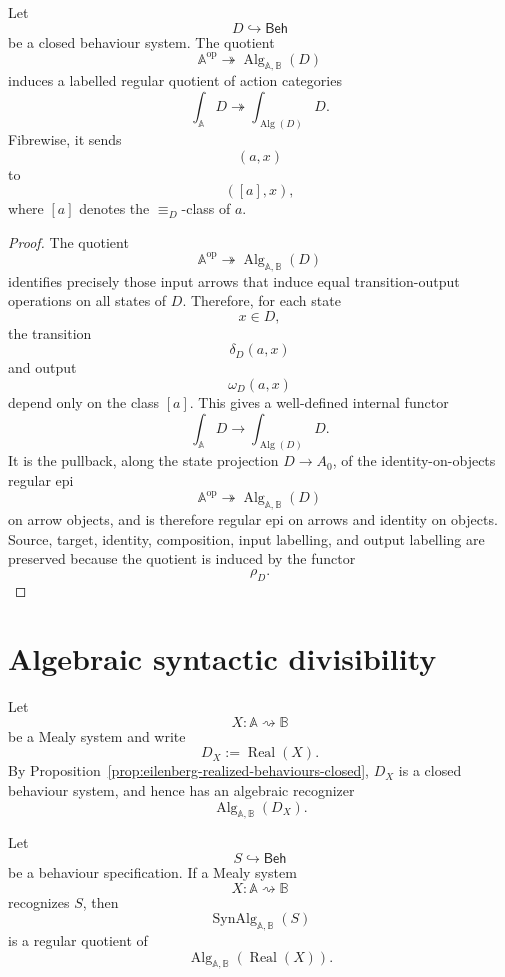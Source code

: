 \begin{proposition}
\label{prop:eilenberg-state-to-algebraic-quotient}
Let
\[
D\hookrightarrow\mathsf{Beh}
\]
be a closed behaviour system. The quotient
\[
\mathbb A^{\mathrm{op}}
\twoheadrightarrow
\operatorname{Alg}_{\mathbb A,\mathbb B}(D)
\]
induces a labelled regular quotient of action categories
\[
\int_{\mathbb A}D
\twoheadrightarrow
\int_{\operatorname{Alg}(D)}D.
\]
Fibrewise, it sends
\[
(a,x)
\]
to
\[
([a],x),
\]
where \([a]\) denotes the \({\equiv_D}\)-class of \(a\).
\end{proposition}

\begin{proof}
The quotient
\[
\mathbb A^{\mathrm{op}}
\twoheadrightarrow
\operatorname{Alg}_{\mathbb A,\mathbb B}(D)
\]
identifies precisely those input arrows that induce equal transition-output
operations on all states of \(D\). Therefore, for each state
\[
x\in D,
\]
the transition
\[
\delta_D(a,x)
\]
and output
\[
\omega_D(a,x)
\]
depend only on the class \([a]\). This gives a well-defined internal functor
\[
\int_{\mathbb A}D
\to
\int_{\operatorname{Alg}(D)}D.
\]
It is the pullback, along the state projection \(D\to A_0\), of the
identity-on-objects regular epi
\[
\mathbb A^{\mathrm{op}}
\twoheadrightarrow
\operatorname{Alg}_{\mathbb A,\mathbb B}(D)
\]
on arrow objects, and is therefore regular epi on arrows and identity on
objects. Source, target, identity, composition, input labelling, and output
labelling are preserved because the quotient is induced by the functor
\[
\rho_D.
\]
\end{proof}

\section{Algebraic syntactic divisibility}
\label{sec:eilenberg-algebraic-syntactic-divisibility}

Let
\[
X:\mathbb A\rightsquigarrow\mathbb B
\]
be a Mealy system and write
\[
D_X:=\operatorname{Real}(X).
\]
By Proposition~\ref{prop:eilenberg-realized-behaviours-closed}, \(D_X\) is a
closed behaviour system, and hence has an algebraic recognizer
\[
\operatorname{Alg}_{\mathbb A,\mathbb B}(D_X).
\]

\begin{theorem}
\label{thm:eilenberg-algebraic-syntactic-divisibility}
Let
\[
S\hookrightarrow\mathsf{Beh}
\]
be a behaviour specification. If a Mealy system
\[
X:\mathbb A\rightsquigarrow\mathbb B
\]
recognizes \(S\), then
\[
\operatorname{SynAlg}_{\mathbb A,\mathbb B}(S)
\]
is a regular quotient of
\[
\operatorname{Alg}_{\mathbb A,\mathbb B}(\operatorname{Real}(X)).
\]
\end{theorem}

